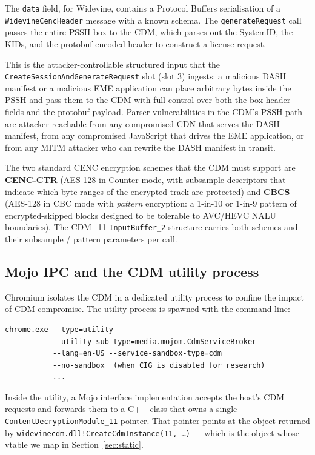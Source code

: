 \documentclass[11pt,letterpaper]{article}
\begin{document}
The \texttt{data} field, for Widevine, contains a Protocol Buffers
serialisation of a \texttt{WidevineCencHeader} message with a known
schema. The \texttt{generateRequest} call passes the entire PSSH box
to the CDM, which parses out the SystemID, the KIDs, and the
protobuf-encoded header to construct a license request.

This is the attacker-controllable structured input that the
\texttt{CreateSessionAndGenerateRequest} slot (slot 3) ingests:
a malicious DASH manifest or a malicious EME application can place
arbitrary bytes inside the PSSH and pass them to the CDM with full
control over both the box header fields and the protobuf payload.
Parser vulnerabilities in the CDM's PSSH path are
attacker-reachable from any compromised CDN that serves the DASH
manifest, from any compromised JavaScript that drives the EME
application, or from any MITM attacker who can rewrite the DASH
manifest in transit.

The two standard CENC encryption schemes that the CDM must support
are \textbf{CENC-CTR} (AES-128 in Counter mode, with subsample
descriptors that indicate which byte ranges of the encrypted track
are protected) and \textbf{CBCS} (AES-128 in CBC mode with
\emph{pattern} encryption: a 1-in-10 or 1-in-9 pattern of
encrypted-skipped blocks designed to be tolerable to AVC/HEVC NALU
boundaries). The CDM\_11 \texttt{InputBuffer\_2} structure carries
both schemes and their subsample / pattern parameters per call.

\subsection{Mojo IPC and the CDM utility process}
\label{sec:bg-mojo}

Chromium isolates the CDM in a dedicated utility process to confine
the impact of CDM compromise. The utility process is spawned with
the command line:

\begin{lstlisting}[basicstyle=\ttfamily\tiny]
chrome.exe --type=utility
           --utility-sub-type=media.mojom.CdmServiceBroker
           --lang=en-US --service-sandbox-type=cdm
           --no-sandbox  (when CIG is disabled for research)
           ...
\end{lstlisting}

Inside the utility, a Mojo interface implementation accepts the
host's CDM requests and forwards them to a C++ class that owns a
single \texttt{ContentDecryptionModule\_11} pointer. That pointer
points at the object returned by
\texttt{widevinecdm.dll!CreateCdmInstance(11, \ldots)} ---
which is the object whose vtable we map in Section~\ref{sec:static}.
\end{document}

